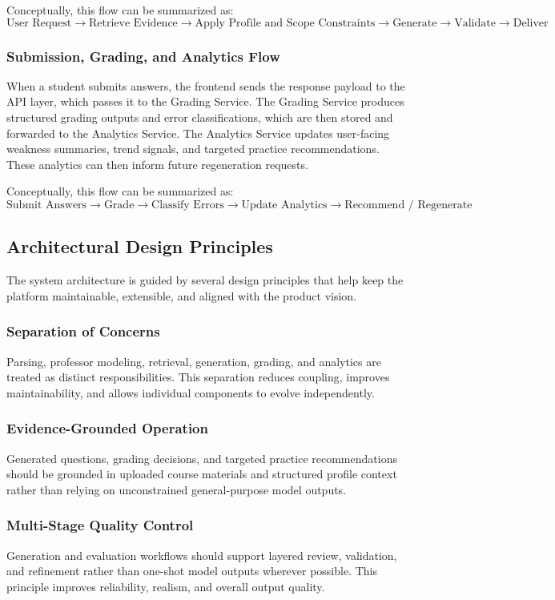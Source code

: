 \documentclass[11pt]{article}
\begin{document}
Conceptually, this flow can be summarized as:
\[
\text{User Request} \rightarrow \text{Retrieve Evidence} \rightarrow \text{Apply Profile and Scope Constraints} \rightarrow \text{Generate} \rightarrow \text{Validate} \rightarrow \text{Deliver}
\]

\subsubsection{Submission, Grading, and Analytics Flow}
When a student submits answers, the frontend sends the response payload to the API layer, which passes it to the Grading Service. The Grading Service produces structured grading outputs and error classifications, which are then stored and forwarded to the Analytics Service. The Analytics Service updates user-facing weakness summaries, trend signals, and targeted practice recommendations. These analytics can then inform future regeneration requests.

Conceptually, this flow can be summarized as:
\[
\text{Submit Answers} \rightarrow \text{Grade} \rightarrow \text{Classify Errors} \rightarrow \text{Update Analytics} \rightarrow \text{Recommend / Regenerate}
\]

\subsection{Architectural Design Principles}
The system architecture is guided by several design principles that help keep the platform maintainable, extensible, and aligned with the product vision.

\subsubsection{Separation of Concerns}
Parsing, professor modeling, retrieval, generation, grading, and analytics are treated as distinct responsibilities. This separation reduces coupling, improves maintainability, and allows individual components to evolve independently.

\subsubsection{Evidence-Grounded Operation}
Generated questions, grading decisions, and targeted practice recommendations should be grounded in uploaded course materials and structured profile context rather than relying on unconstrained general-purpose model outputs.

\subsubsection{Multi-Stage Quality Control}
Generation and evaluation workflows should support layered review, validation, and refinement rather than one-shot model outputs wherever possible. This principle improves reliability, realism, and overall output quality.
\end{document}
